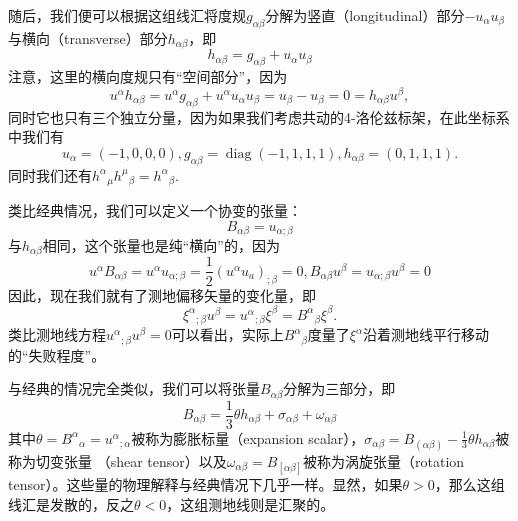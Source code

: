 \documentclass[hyperref, UTF8, a4paper]{ctexart}
\begin{document}
随后，我们便可以根据这组线汇将度规$g_{\alpha \beta }$分解为竖直（longitudinal）部分$-u_{\alpha } u_{\beta }$与横向（transverse）部分$h_{\alpha \beta }$，即
\begin{equation*}
	h_{\alpha \beta } =g_{\alpha \beta } +u_{\alpha } u_{\beta }
\end{equation*}
注意，这里的横向度规只有“空间部分”，因为
\begin{equation*}
	u^{\alpha } h_{\alpha \beta } =u^{\alpha } g_{\alpha \beta } +u^{\alpha } u_{\alpha } u_{\beta } =u_{\beta } -u_{\beta } =0=h_{\alpha \beta } u^{\beta } ,
\end{equation*}
同时它也只有三个独立分量，因为如果我们考虑共动的4-洛伦兹标架，在此坐标系中我们有
\begin{equation*}
	u_{\alpha } =( -1,0,0,0) ,g_{\alpha \beta } =\operatorname{diag}( -1,1,1,1) ,h_{\alpha \beta } =( 0,1,1,1) .
\end{equation*}
同时我们还有$h^{\alpha }{}_{\mu } h^{\mu }{}_{\beta } =h^{\alpha }{}_{\beta }$.



类比经典情况，我们可以定义一个协变的张量：
\begin{equation*}
	B_{\alpha \beta } =u_{\alpha ;\beta }
\end{equation*}
与$h_{\alpha \beta }$相同，这个张量也是纯“横向”的，因为
\begin{equation*}
	u^{\alpha } B_{\alpha \beta } =u^{\alpha } u_{\alpha ;\beta } =\frac{1}{2} (u^{\alpha } u_{a} )_{;\beta } =0,B_{\alpha \beta } u^{\beta } =u_{\alpha ;\beta } u^{\beta } =0
\end{equation*}
因此，现在我们就有了测地偏移矢量的变化量，即
\begin{equation*}
	\xi ^{\alpha }{}_{;\beta } u^{\beta } =u^{\alpha }{}_{;\beta } \xi ^{\beta } =B^{\alpha }{}_{\beta } \xi ^{\beta } .
\end{equation*}
类比测地线方程$u^{\alpha }{}_{;\beta } u^{\beta } =0$可以看出，实际上$B^{\alpha }{}_{\beta }$度量了$\xi ^{\alpha }$沿着测地线平行移动的“失败程度”。



与经典的情况完全类似，我们可以将张量$B_{\alpha \beta }$分解为三部分，即
\begin{equation*}
	B_{\alpha \beta } =\frac{1}{3} \theta h_{\alpha \beta } +\sigma _{\alpha \beta } +\omega _{\alpha \beta }
\end{equation*}
其中$\theta =B^{\alpha }{}_{\alpha } =u^{\alpha }{}_{;\alpha }$被称为膨胀标量（expansion scalar），$\sigma _{\alpha \beta } =B_{( \alpha \beta )} -\frac{1}{3} \theta h_{\alpha \beta }$被称为切变张量 （shear tensor）以及$\omega _{\alpha \beta } =B_{[ \alpha \beta ]}$被称为涡旋张量（rotation tensor）。这些量的物理解释与经典情况下几乎一样。显然，如果$\theta  >0$，那么这组线汇是发散的，反之$\theta < 0$，这组测地线则是汇聚的。
\end{document}
